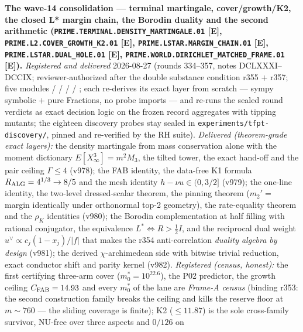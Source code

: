 \documentclass[11pt,a4paper]{article}
\begin{document}
\par\smallskip\noindent\textbf{The wave-14 consolidation --- terminal
martingale, cover/growth/K2, the closed L* margin chain, the Borodin
duality and the second arithmetic
(\texttt{PRIME.TERMINAL.\allowbreak DENSITY\_MARTINGALE.01} [E],
\texttt{PRIME.L2.\allowbreak COVER\_GROWTH\_K2.01} [E],
\texttt{PRIME.LSTAR.\allowbreak MARGIN\_CHAIN.01} [E],
\texttt{PRIME.LSTAR.\allowbreak DUAL\_HOLE.01} [E],
\texttt{PRIME.WORLD.\allowbreak DIRICHLET\_MATCHED\_FRAME.01} [E]).}
{\sloppy
\emph{Registered and delivered} 2026-08-27 (rounds 334--357, notes
DCLXXXI--DCCIX; reviewer-authorized after the double substance
condition r355 $+$ r357; five modules
 /
 /
 /
 /
; each re-derives its exact
layer from scratch --- sympy symbolic $+$ pure Fractions, no probe
imports --- and re-runs the sealed round verdicts as exact decision
logic on the frozen record aggregates with tipping mutants; the
eighteen discovery probes stay sealed in
\texttt{experiments/tfpt-discovery/}, pinned and re-verified by the
RH suite).  \emph{Delivered (theorem-grade exact layers):} the
density martingale from mass conservation alone with the moment
dictionary $E[X_\infty^3] = m^2 M_3$, the tilted tower, the exact
hand-off and the pair ceiling $\Gamma \le 4$ (v978); the FAB
identity, the data-free K1 formula $R_{\rm ALG} = 4^{1/3} \to 8/5$
and the mesh identity $h - \nu u \in (0, 3/2]$ (v979); the one-line
identity, the two-level dressed-scalar theorem, the pinning theorem
($m_2' = $ margin identically under orthonormal top-2 geometry),
the rate-equality theorem and the $\rho_K$ identities (v980); the
Borodin complementation at half filling with rational conjugator,
the equivalence $L^* \Leftrightarrow R > \tfrac12 I$, and the
reciprocal dual weight $u^\vee \propto c_j(1-x_j)/|f|$ that makes
the r354 anti-correlation \emph{duality algebra by design} (v981);
the derived $\chi$-archimedean side with bitwise trivial reduction,
exact conductor shift and parity kernel (v982).  \emph{Registered
(census, honest):} the first certifying three-arm cover
($m_0^* = 10^{22.6}$), the P02 predictor, the growth ceiling
$C_{\rm FAB} = 14.93$ and every $m_0^*$ of the lane are
\emph{Frame-A census} (binding r353: the second construction family
breaks the ceiling and kills the reserve floor at $m \sim 760$ ---
the sliding coverage is finite); K2 ($\le 11.87$) is the sole
cross-family survivor, NU-free over three aspects and $0/126$ on
}
\end{document}
